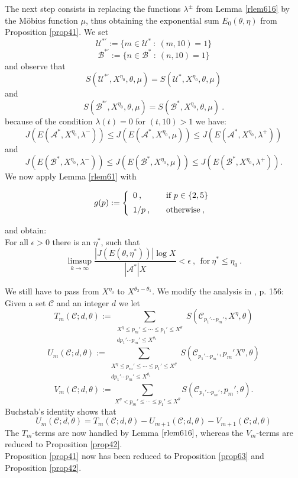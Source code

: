 \documentclass{amsart}
\numberwithin{equation}{subsection}
\begin{document}
\noindent The next step consists in replacing the functions $\lambda^{\pm}$ from Lemma \ref{rlem616} by the M\"obius function $\mu$, thus obtaining the exponential sum $E_0(\theta, \eta)$ from Proposition \ref{prop41}. We set
$$\mathcal{U}^{*'}:=\{ m\in \mathcal{U}^*\::\: (m, 10)=1\}$$
$$\mathcal{B}^{*'}:=\{ n\in \mathcal{B}^*\::\: (n, 10)=1\}$$
and observe that
$$S(\mathcal{U}^{*'}, X^{\eta_0}, \theta, \mu)=S(\mathcal{U}^*, X^{\eta_0}, \theta, \mu)$$
and
$$S(\mathcal{B}^{*'}, X^{\eta_0}, \theta, \mu)=S(\mathcal{B}^*, X^{\eta_0}, \theta, \mu)\:.$$
because of the condition $\lambda(t)=0$ for $(t, 10)>1$ we have:
\[
J(E(\mathcal{A}^*, X^{\eta_0}, \lambda^-))\leq J(E(\mathcal{A}^*, X^{\eta_0}, \mu))\leq J(E(\mathcal{A}^*, X^{\eta_0}, \lambda^+)) \tag{6.12}
\]
and
\[
J(E(\mathcal{B}^*, X^{\eta_0}, \lambda^-))\leq J(E(\mathcal{B}^*, X^{\eta_0}, \mu))\leq J(E(\mathcal{B}^*, X^{\eta_0}, \lambda^+)). \tag{6.13}
\]
We now apply Lemma \ref{rlem61} with 

\begin{eqnarray}
g(p):=\left\{ 
  \begin{array}{l l}
   0\:, & \quad \text{if $p\in \{2, 5\}$}\vspace{2mm}\\ 
    1/p\:, & \quad \text{otherwise}\:,\\
  \end{array} \right.
\nonumber
\end{eqnarray}

and obtain:\\
For all $\epsilon>0$ there is an $\eta^*$, such that
$$\limsup_{k\rightarrow\infty} \frac{|J(E(\theta, \eta^*))|\log X}{|\mathcal{A}^*|X}< \epsilon\:,\ \ \text{for}\ \eta^*\leq \eta_0\:.$$

We still have to pass from $X^{\eta_0}$ to $X^{\theta_2-\theta_1}$. We modify the analysis in \cite{maynard}, p. 156:\\
Given a set $\mathcal{C}$ and an integer $d$ we let
$$T_m(\mathcal{C}; d, \theta):=\sum_{\substack{X^\eta\leq p_m'\leq \cdots \leq p_1'\leq X^\theta \\ d{p_1'\cdots p_m'}\leq X^{\theta_1}}} S(\mathcal{C}_{p_1'\cdots p_m'}, X^\eta, \theta) $$
$$U_m(\mathcal{C}; d, \theta):=\sum_{\substack{X^\eta\leq p_m'\leq \cdots \leq p_1'\leq X^\theta \\ d{p_1'\cdots p_m'}\leq X^{\theta_1}}} S(\mathcal{C}_{p_1'\cdots p_m'}, p_m'X^\eta, \theta) $$
$$V_m(\mathcal{C}; d, \theta):=\sum_{X^\eta< p_m'\leq \cdots \leq p_1'\leq X^\theta } S(\mathcal{C}_{p_1'\cdots p_m'}, p_m', \theta) .$$
Buchstab's identity shows that 
$$U_m(\mathcal{C}; d, \theta)=T_m(\mathcal{C}; d, \theta)-U_{m+1}(\mathcal{C}; d, \theta)-V_{m+1}(\mathcal{C}; d, \theta)$$
The $T_m$-terms are now handled by Lemma $\ref{rlem616}$, whereas the $V_m$-terms are reduced to Proposition \ref{prop42}.\\
Proposition \ref{prop41} now has been reduced to Proposition \ref{prop63} and Proposition \ref{prop42}.
\end{document}
